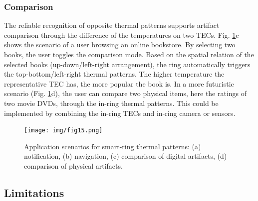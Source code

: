\documentclass[preprint,12pt]{elsarticle}
\begin{document}
\subsubsection{Comparison}
The reliable recognition of opposite thermal patterns supports artifact comparison through the difference of the temperatures on two TECs. Fig. \ref{fig:15}c shows the scenario of a user browsing an online bookstore. By selecting two books, the user toggles the comparison mode. Based on the spatial relation of the selected books (up-down/left-right arrangement), the ring automatically triggers the top-bottom/left-right thermal patterns. The higher temperature the representative TEC has, the more popular the book is. In a more futuristic scenario (Fig. \ref{fig:15}d), the user can compare two physical items, here the ratings of two movie DVDs, through the in-ring thermal patterns. This could be implemented by combining the in-ring TECs and in-ring camera or sensors.

\begin{figure}[tp]
  \centering
  \texttt{[image: img/fig15.png]}
  \caption{Application scenarios for smart-ring thermal patterns: (a) notification, (b) navigation, (c) comparison of digital artifacts, (d) comparison of physical artifacts.}
  \label{fig:15}
\end{figure}

\subsection{Limitations}


\end{document}
